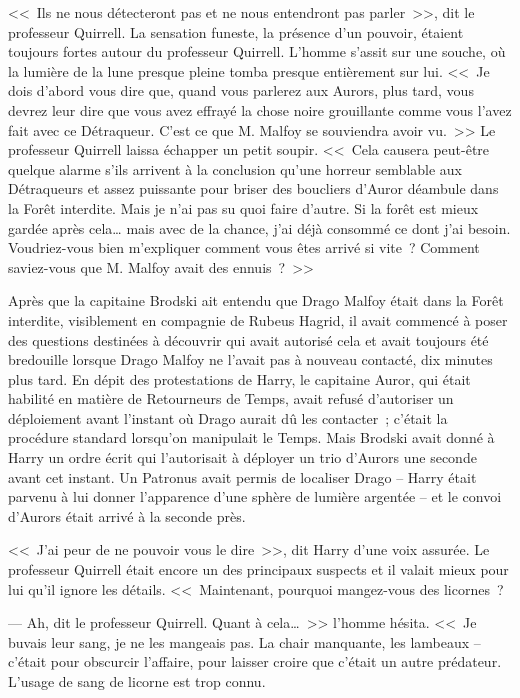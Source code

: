 <<~Ils ne nous détecteront pas et ne nous entendront pas parler~>>, dit le professeur Quirrell. La sensation funeste, la présence d'un pouvoir, étaient toujours fortes autour du professeur Quirrell. L'homme s'assit sur une souche, où la lumière de la lune presque pleine tomba presque entièrement sur lui. <<~Je dois d'abord vous dire que, quand vous parlerez aux Aurors, plus tard, vous devrez leur dire que vous avez effrayé la chose noire grouillante comme vous l'avez fait avec ce Détraqueur. C'est ce que M. Malfoy se souviendra avoir vu.~>> Le professeur Quirrell laissa échapper un petit soupir. <<~Cela causera peut-être quelque alarme s'ils arrivent à la conclusion qu'une horreur semblable aux Détraqueurs et assez puissante pour briser des boucliers d'Auror déambule dans la Forêt interdite. Mais je n'ai pas su quoi faire d'autre. Si la forêt est mieux gardée après cela… mais avec de la chance, j'ai déjà consommé ce dont j'ai besoin. Voudriez-vous bien m'expliquer comment vous êtes arrivé si vite~? Comment saviez-vous que M. Malfoy avait des ennuis~?~>>

Après que la capitaine Brodski ait entendu que Drago Malfoy était dans la Forêt interdite, visiblement en compagnie de Rubeus Hagrid, il avait commencé à poser des questions destinées à découvrir qui avait autorisé cela et avait toujours été bredouille lorsque Drago Malfoy ne l'avait pas à nouveau contacté, dix minutes plus tard. En dépit des protestations de Harry, le capitaine Auror, qui était habilité en matière de Retourneurs de Temps, avait refusé d'autoriser un déploiement avant l'instant où Drago aurait dû les contacter~; c'était la procédure standard lorsqu'on manipulait le Temps. Mais Brodski avait donné à Harry un ordre écrit qui l'autorisait à déployer un trio d'Aurors une seconde avant cet instant. Un Patronus avait permis de localiser Drago -- Harry était parvenu à lui donner l'apparence d'une sphère de lumière argentée -- et le convoi d'Aurors était arrivé à la seconde près.

<<~J'ai peur de ne pouvoir vous le dire~>>, dit Harry d'une voix assurée. Le professeur Quirrell était encore un des principaux suspects et il valait mieux pour lui qu'il ignore les détails. <<~Maintenant, pourquoi mangez-vous des licornes~?

--- Ah, dit le professeur Quirrell. Quant à cela…~>> l'homme hésita. <<~Je buvais leur sang, je ne les mangeais pas. La chair manquante, les lambeaux -- c'était pour obscurcir l'affaire, pour laisser croire que c'était un autre prédateur. L'usage de sang de licorne est trop connu.

